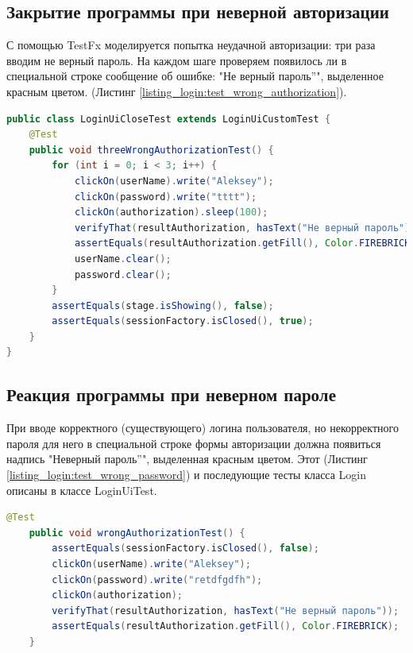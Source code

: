 \documentclass[a4paper,12pt]{article}
\begin{document}
\subsection{Закрытие программы при неверной авторизации}
С помощью TestFx моделируется попытка неудачной авторизации: три раза вводим не верный пароль. На каждом шаге проверяем появилось ли в специальной строке сообщение об ошибке: "Не верный пароль''", выделенное красным цветом. (Листинг \ref{listing_login:test_wrong_authorization}).
\begin{lstlisting}[language=java, caption=Тестирование неверной авторизации, label=listing_login:test_wrong_authorization]
public class LoginUiCloseTest extends LoginUiCustomTest {
    @Test
    public void threeWrongAuthorizationTest() {
        for (int i = 0; i < 3; i++) {
            clickOn(userName).write("Aleksey");
            clickOn(password).write("tttt");
            clickOn(authorization).sleep(100);
            verifyThat(resultAuthorization, hasText("Не верный пароль"));
            assertEquals(resultAuthorization.getFill(), Color.FIREBRICK);
            userName.clear();
            password.clear();
        }
        assertEquals(stage.isShowing(), false);
        assertEquals(sessionFactory.isClosed(), true);
    }
}
\end{lstlisting}

\subsection{Реакция программы при неверном пароле}
При вводе корректного (существующего) логина пользователя, но некорректного пароля для него в специальной строке формы авторизации должна появиться надпись "Неверный пароль''", выделенная красным цветом. Этот (Листинг \ref{listing_login:test_wrong_password}) и последующие тесты класса Login описаны в классе LoginUiTest.

\begin{lstlisting}[language=java, caption=Тестирование ввода неверного пароля, label=listing_login:test_wrong_password]      
    @Test
    public void wrongAuthorizationTest() {
        assertEquals(sessionFactory.isClosed(), false);
        clickOn(userName).write("Aleksey");
        clickOn(password).write("retdfgdfh");
        clickOn(authorization);
        verifyThat(resultAuthorization, hasText("Не верный пароль"));
        assertEquals(resultAuthorization.getFill(), Color.FIREBRICK);
    }
\end{lstlisting}
\end{document}
